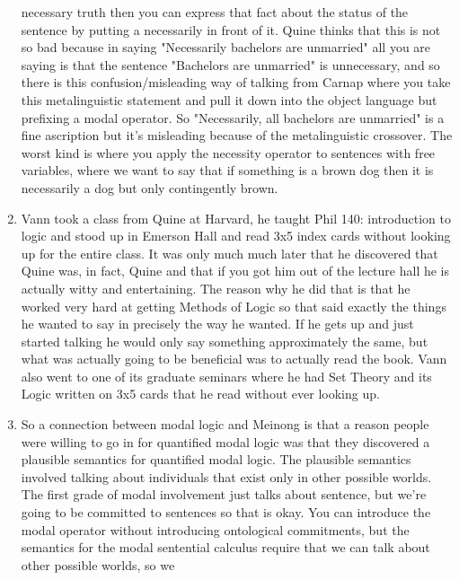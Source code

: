 \documentclass[12pt]{article}
\theoremstyle{definition}
\begin{document}
\begin{enumerate}
        necessary truth then you can express that fact about the status of the
        sentence by putting a necessarily in front of it. Quine thinks that
        this is not so bad because in saying "Necessarily bachelors are
        unmarried" all you are saying is that the sentence "Bachelors are
        unmarried" is unnecessary, and so there is this confusion/misleading
        way of talking from Carnap where you take this metalinguistic statement
        and pull it down into the object language but prefixing a modal
        operator. So "Necessarily, all bachelors are unmarried" is a fine
        ascription but it's misleading because of the metalinguistic crossover.
        The worst kind is where you apply the necessity operator to sentences
        with free variables, where we want to say that if something is a brown
        dog then it is necessarily a dog but only contingently brown.
    \item
        Vann took a class from Quine at Harvard, he taught Phil 140:
        introduction to logic and stood up in Emerson Hall and read 3x5 index
        cards without looking up for the entire class. It was only much much
        later that he discovered that Quine was, in fact, Quine and that if you
        got him out of the lecture hall he is actually witty and entertaining.
        The reason why he did that is that he worked very hard at getting
        Methods of Logic so that said exactly the things he wanted to say in
        precisely the way he wanted. If he gets up and just started talking he
        would only say something approximately the same, but what was actually
        going to be beneficial was to actually read the book. Vann also went to
        one of its graduate seminars where he had Set Theory and its Logic
        written on 3x5 cards that he read without ever looking up.
    \item
        So a connection between modal logic and Meinong is that a reason people
        were willing to go in for quantified modal logic was that they
        discovered a plausible semantics for quantified modal logic. The
        plausible semantics involved talking about individuals that exist only
        in other possible worlds. The first grade of modal involvement just
        talks about sentence, but we're going to be committed to sentences so
        that is okay. You can introduce the modal operator without introducing
        ontological commitments, but the semantics for the modal sentential
        calculus require that we can talk about other possible worlds, so we

\end{enumerate}
\end{document}
